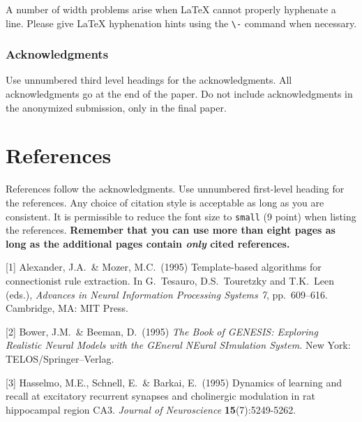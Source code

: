 \documentclass{article}
\begin{document}
A number of width problems arise when \LaTeX{} cannot properly hyphenate a
line. Please give LaTeX hyphenation hints using the \verb+\-+ command when
necessary.

\subsubsection*{Acknowledgments}

Use unnumbered third level headings for the acknowledgments. All acknowledgments
go at the end of the paper. Do not include acknowledgments in the anonymized
submission, only in the final paper.

\section*{References}

References follow the acknowledgments. Use unnumbered first-level heading for
the references. Any choice of citation style is acceptable as long as you are
consistent. It is permissible to reduce the font size to \verb+small+ (9 point)
when listing the references. {\bf Remember that you can use more than eight
  pages as long as the additional pages contain \emph{only} cited references.}
\medskip

\small

[1] Alexander, J.A.\ \& Mozer, M.C.\ (1995) Template-based algorithms for
connectionist rule extraction. In G.\ Tesauro, D.S.\ Touretzky and T.K.\ Leen
(eds.), {\it Advances in Neural Information Processing Systems 7},
pp.\ 609--616. Cambridge, MA: MIT Press.

[2] Bower, J.M.\ \& Beeman, D.\ (1995) {\it The Book of GENESIS: Exploring
  Realistic Neural Models with the GEneral NEural SImulation System.}  New York:
TELOS/Springer--Verlag.

[3] Hasselmo, M.E., Schnell, E.\ \& Barkai, E.\ (1995) Dynamics of learning and
recall at excitatory recurrent synapses and cholinergic modulation in rat
hippocampal region CA3. {\it Journal of Neuroscience} {\bf 15}(7):5249-5262.
\end{document}
